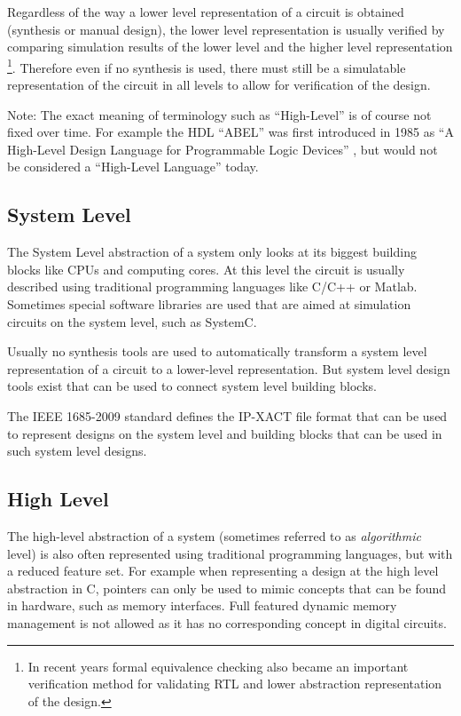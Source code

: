Regardless of the way a lower level representation of a circuit is
obtained (synthesis or manual design), the lower level representation is usually
verified by comparing simulation results of the lower level and the higher level
representation \footnote{In recent years formal equivalence
checking also became an important verification method for validating RTL and
lower abstraction representation of the design.}.
Therefore even if no synthesis is used, there must still be a simulatable
representation of the circuit in all levels to allow for verification of the
design.

Note: The exact meaning of terminology such as ``High-Level'' is of course not
fixed over time. For example the HDL ``ABEL'' was first introduced in 1985 as ``A High-Level
Design Language for Programmable Logic Devices'' \cite{ABEL}, but would not
be considered a ``High-Level Language'' today.

\subsection{System Level}

The System Level abstraction of a system only looks at its biggest building
blocks like CPUs and computing cores. At this level the circuit is usually described
using traditional programming languages like C/C++ or Matlab. Sometimes special
software libraries are used that are aimed at simulation circuits on the system
level, such as SystemC.

Usually no synthesis tools are used to automatically transform a system level
representation of a circuit to a lower-level representation. But system level
design tools exist that can be used to connect system level building blocks.

The IEEE 1685-2009 standard defines the IP-XACT file format that can be used to
represent designs on the system level and building blocks that can be used in
such system level designs. \cite{IP-XACT}

\subsection{High Level}

The high-level abstraction of a system (sometimes referred to as {\it
algorithmic} level) is also often represented using traditional programming
languages, but with a reduced feature set. For example when representing a
design at the high level abstraction in C, pointers can only be used to mimic
concepts that can be found in hardware, such as memory interfaces. Full
featured dynamic memory management is not allowed as it has no corresponding
concept in digital circuits.

